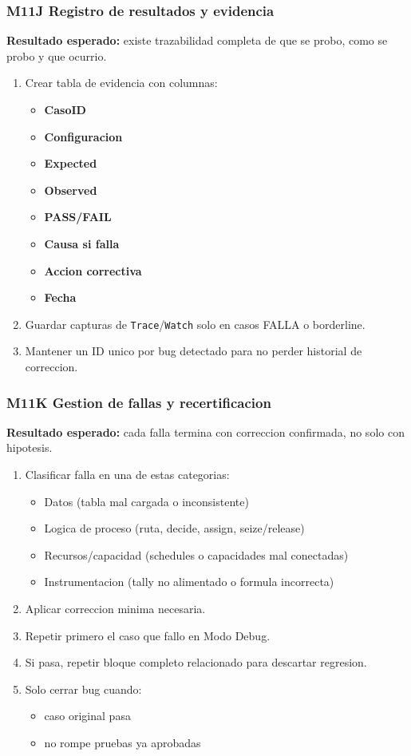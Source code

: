 \documentclass[11pt]{article}
\newcommand{\simio}[1]{\texttt{#1}}
\begin{document}
\subsubsection{M11J Registro de resultados y evidencia}
\textbf{Resultado esperado:} existe trazabilidad completa de que se probo, como se probo y que ocurrio.

\begin{enumerate}
  \item Crear tabla de evidencia con columnas:
  \begin{itemize}
    \item \textbf{CasoID}
    \item \textbf{Configuracion}
    \item \textbf{Expected}
    \item \textbf{Observed}
    \item \textbf{PASS/FAIL}
    \item \textbf{Causa si falla}
    \item \textbf{Accion correctiva}
    \item \textbf{Fecha}
  \end{itemize}
  \item Guardar capturas de \simio{Trace}/\simio{Watch} solo en casos FALLA o borderline.
  \item Mantener un ID unico por bug detectado para no perder historial de correccion.
\end{enumerate}

\subsubsection{M11K Gestion de fallas y recertificacion}
\textbf{Resultado esperado:} cada falla termina con correccion confirmada, no solo con hipotesis.

\begin{enumerate}
  \item Clasificar falla en una de estas categorias:
  \begin{itemize}
    \item Datos (tabla mal cargada o inconsistente)
    \item Logica de proceso (ruta, decide, assign, seize/release)
    \item Recursos/capacidad (schedules o capacidades mal conectadas)
    \item Instrumentacion (tally no alimentado o formula incorrecta)
  \end{itemize}
  \item Aplicar correccion minima necesaria.
  \item Repetir primero el caso que fallo en Modo Debug.
  \item Si pasa, repetir bloque completo relacionado para descartar regresion.
  \item Solo cerrar bug cuando:
  \begin{itemize}
    \item caso original pasa
    \item no rompe pruebas ya aprobadas
  \end{itemize}
\end{enumerate}
\end{document}
